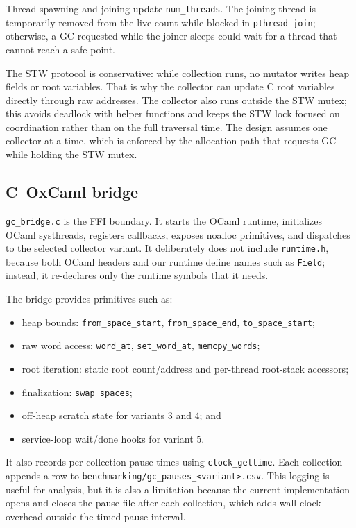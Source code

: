 \documentclass[11pt,a4paper]{article}
\begin{document}
Thread spawning and joining update \texttt{num\_threads}.  The joining thread is
temporarily removed from the live count while blocked in \texttt{pthread\_join};
otherwise, a GC requested while the joiner sleeps could wait for a thread that
cannot reach a safe point.

The STW protocol is conservative: while collection runs, no mutator writes heap
fields or root variables.  That is why the collector can update C root variables
directly through raw addresses.  The collector also runs outside the STW mutex;
this avoids deadlock with helper functions and keeps the STW lock focused on
coordination rather than on the full traversal time.  The design assumes one
collector at a time, which is enforced by the allocation path that requests GC
while holding the STW mutex.

\subsection{C--OxCaml bridge}

\texttt{gc\_bridge.c} is the FFI boundary.  It starts the OCaml runtime,
initializes OCaml systhreads, registers callbacks, exposes noalloc primitives,
and dispatches to the selected collector variant.  It deliberately does not
include \texttt{runtime.h}, because both OCaml headers and our runtime define
names such as \texttt{Field}; instead, it re-declares only the runtime symbols
that it needs.

The bridge provides primitives such as:
\begin{itemize}
  \item heap bounds: \texttt{from\_space\_start}, \texttt{from\_space\_end},
  \texttt{to\_space\_start};
  \item raw word access: \texttt{word\_at}, \texttt{set\_word\_at},
  \texttt{memcpy\_words};
  \item root iteration: static root count/address and per-thread root-stack
  accessors;
  \item finalization: \texttt{swap\_spaces};
  \item off-heap scratch state for variants 3 and 4; and
  \item service-loop wait/done hooks for variant 5.
\end{itemize}

It also records per-collection pause times using \texttt{clock\_gettime}.  Each
collection appends a row to \texttt{benchmarking/gc\_pauses\_<variant>.csv}.
This logging is useful for analysis, but it is also a limitation because the
current implementation opens and closes the pause file after each collection,
which adds wall-clock overhead outside the timed pause interval.
\end{document}
